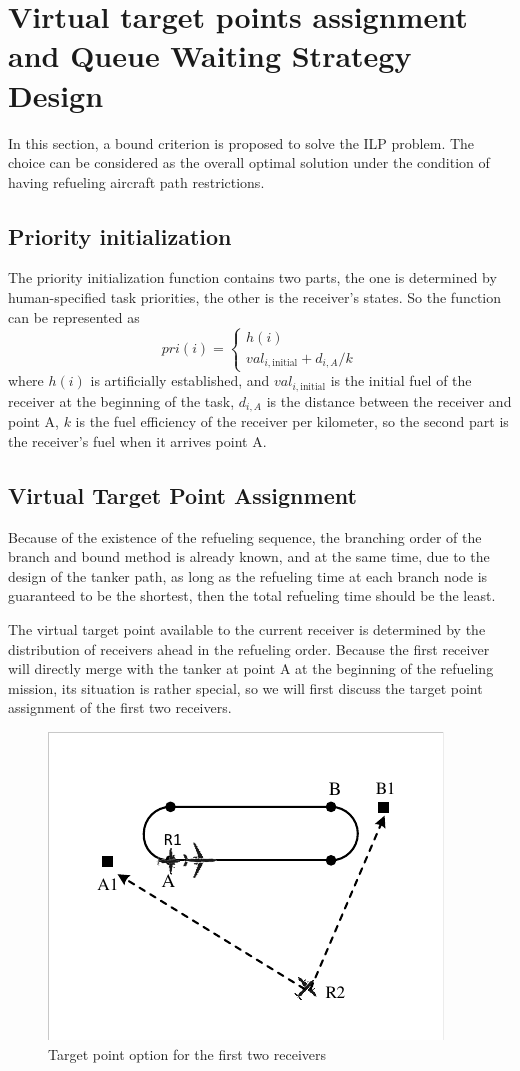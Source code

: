 \section{Virtual target points assignment and Queue Waiting Strategy Design}
In this section, a bound criterion is proposed to solve the ILP problem. The choice can be considered as the overall optimal solution under the condition of having refueling aircraft path restrictions. 
\subsection{Priority initialization}\label{AA}
The priority initialization function contains two parts, the one is determined by human-specified task priorities, the other is the receiver's states. So the function can be represented as
\begin{equation}
pri{(i)}=\begin{cases}
h{(i)} \\
val_{i,\text{initial}} +d_{i,A}/k 
\end{cases}
\end{equation}
where $ h{(i)} $ is artificially established, and $ val_{i,\text{initial}} $ is the initial fuel of the receiver at the beginning of the task, $ d_{i,A} $ is the distance between the receiver and point A, $ k $ is the fuel efficiency of the receiver per kilometer, so the second part is the receiver's fuel when it arrives point A.
\subsection{Virtual Target Point Assignment}
Because of the existence of the refueling sequence, the branching order of the branch and bound method is already known, and at the same time, due to the design of the tanker path, as long as the refueling time at each branch node is guaranteed to be the shortest, then the total refueling time should be the least.

The virtual target point available to the current receiver is determined by the distribution of receivers ahead in the refueling order. Because the first receiver will directly merge with the tanker at point A at the beginning of the refueling mission, its situation is rather special, so we will first discuss the target point assignment of the first two receivers.
\begin{figure}[htbp]
	\centerline{\includegraphics[width=.25\textwidth]{Figures/Figs_Ch15/fig3.pdf}}
	\caption{Target point option for the first two receivers}
	\label{fig}
\end{figure}

